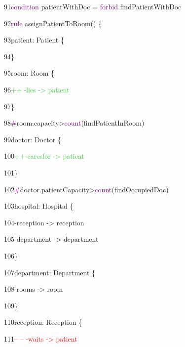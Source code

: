 {

91\hspace{0.5cm}\textcolor{Purple}{condition} patientWithDoc = \textcolor{Purple}{forbid} findPatientWithDoc

92\hspace{0.5cm}\textcolor{Purple}{rule} assignPatientToRoom() \{

93\hspace{1cm}patient: Patient \{

94\hspace{1cm}\}

95\hspace{1cm}room: Room \{

96\hspace{1.5cm}\textcolor{LimeGreen}{++ -lies -> patient}

97\hspace{1cm}\}

98\hspace{1cm}\textcolor{Purple}{\#}room.capacity>\textcolor{Purple}{count}(findPatientInRoom)

99\hspace{1cm}doctor: Doctor \{

100\hspace{1.5cm}\textcolor{LimeGreen}{++-caresfor -> patient}

101\hspace{1cm}\}

102\hspace{1cm}\textcolor{Purple}{\#}doctor.patientCapacity>\textcolor{Purple}{count}(findOccupiedDoc)

103\hspace{1cm}hospital: Hospital \{

104\hspace{1.5cm}-reception -> reception

105\hspace{1.5cm}-department -> department

106\hspace{1cm}\}

107\hspace{1cm}department: Department \{

108\hspace{1.5cm}-rooms -> room

109\hspace{1cm}\}

110\hspace{1cm}reception: Reception \{

111\hspace{1.5cm}\textcolor{red}{-- -- -waits -> patient}

}
